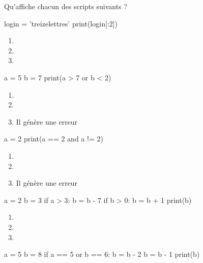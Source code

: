 \documentclass[a4paper,10pt]{article}
\begin{document}

Qu'affiche chacun des scripts suivants ?\\
\begin{multicols}{2}
\begin{pythoncode}
login = 'treizelettres'
print(login[:2])
\end{pythoncode}
\begin{enumerate}[\case\ \ a.]
\item {}
\item {}
\item {}
\end{enumerate}

\begin{pythoncode}
a = 5
b = 7
print(a > 7 or b < 2)
\end{pythoncode}
\begin{enumerate}[\case\ \ a.]
\item 	{}
\item 	{}
\item 	Il génère une erreur
\end{enumerate}
\begin{pythoncode}
a = 2
print(a == 2 and a != 2)
\end{pythoncode}
\begin{enumerate}[\case\ \ a.]
\item 	{}
\item 	{}
\item 	Il génère une erreur
\end{enumerate}
\columnbreak
\begin{pythoncode}
a = 2
b = 3
if a > 3:
    b = b - 7
if b > 0:
    b = b + 1
print(b)
\end{pythoncode}
\begin{enumerate}[\case\ \ a.]
\item 	{}
\item 	{}
\item 	{}
\end{enumerate}

\begin{pythoncode}
a = 5
b = 8
if a == 5 or b == 6:
    b = b - 2
b = b - 1
print(b)
\end{pythoncode}


\end{multicols}
\end{document}
